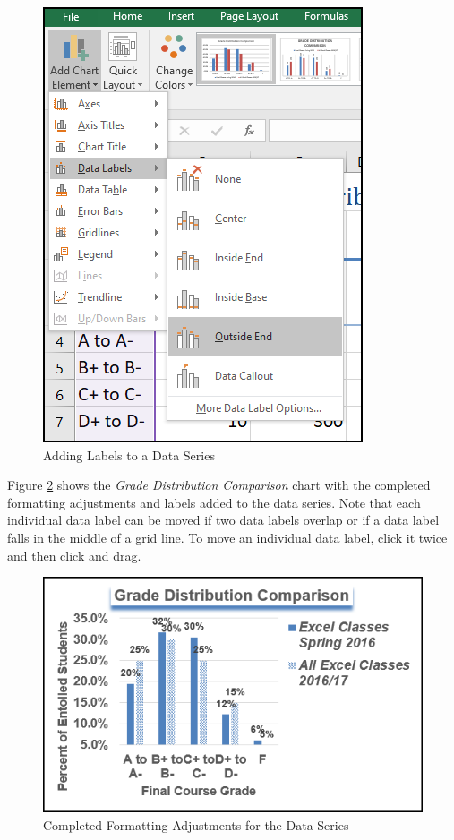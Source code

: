 \begin{figure}[H]
	\centering
	\includegraphics[width=\maxwidth{.75\linewidth}]{gfx/ch04_fig38}
	\caption{Adding Labels to a Data Series}
	\label{04:fig38}
\end{figure}

Figure \ref{04:fig39} shows the \textit{Grade Distribution Comparison} chart with the completed formatting adjustments and labels added to the data series. Note that each individual data label can be moved if two data labels overlap or if a data label falls in the middle of a grid line. To move an individual data label, click it twice and then click and drag.

\begin{figure}[H]
	\centering
	\includegraphics[width=\maxwidth{.95\linewidth}]{gfx/ch04_fig39}
	\caption{Completed Formatting Adjustments for the Data Series}
	\label{04:fig39}
\end{figure}

